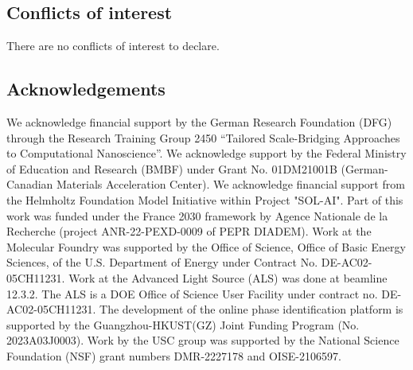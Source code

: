 \documentclass[a4paper]{article}
\begin{document}
\subsection*{Conflicts of interest}
There are no conflicts of interest to declare.

\subsection*{Acknowledgements}
We acknowledge financial support by the German Research Foundation (DFG) through the Research Training Group 2450 “Tailored Scale-Bridging Approaches to Computational Nanoscience”. We acknowledge support by the Federal Ministry of Education and Research (BMBF) under Grant No. 01DM21001B (German-Canadian Materials Acceleration Center). We acknowledge financial support from the Helmholtz Foundation Model Initiative within Project "SOL-AI". Part of this work was funded under the France 2030 framework by Agence Nationale de la Recherche (project ANR-22-PEXD-0009 of PEPR DIADEM). Work at the Molecular Foundry was supported by the Office of Science, Office of Basic Energy Sciences, of the U.S. Department of Energy under Contract No. DE-AC02-05CH11231. Work at the Advanced Light Source (ALS) was done at beamline 12.3.2. The ALS is a DOE Office of Science User Facility under contract no. DE-AC02-05CH11231. The development of the online phase identification platform is supported by the Guangzhou-HKUST(GZ) Joint Funding Program (No. 2023A03J0003). Work by the USC group was supported by the National Science Foundation (NSF) grant numbers DMR-2227178 and OISE-2106597. 



\end{document}
